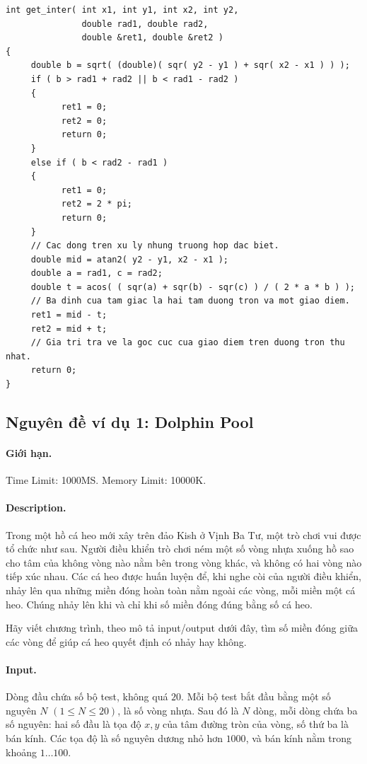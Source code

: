 \documentclass[11pt]{article}
\begin{document}
\begin{verbatim}
int get_inter( int x1, int y1, int x2, int y2,
               double rad1, double rad2,
               double &ret1, double &ret2 )
{
     double b = sqrt( (double)( sqr( y2 - y1 ) + sqr( x2 - x1 ) ) );
     if ( b > rad1 + rad2 || b < rad1 - rad2 )
     {
           ret1 = 0;
           ret2 = 0;
           return 0;
     }
     else if ( b < rad2 - rad1 )
     {
           ret1 = 0;
           ret2 = 2 * pi;
           return 0;
     }
     // Cac dong tren xu ly nhung truong hop dac biet.
     double mid = atan2( y2 - y1, x2 - x1 );
     double a = rad1, c = rad2;
     double t = acos( ( sqr(a) + sqr(b) - sqr(c) ) / ( 2 * a * b ) );
     // Ba dinh cua tam giac la hai tam duong tron va mot giao diem.
     ret1 = mid - t;
     ret2 = mid + t;
     // Gia tri tra ve la goc cuc cua giao diem tren duong tron thu nhat.
     return 0;
}
\end{verbatim}

\subsection{Nguyên đề ví dụ 1: Dolphin Pool}

\paragraph{Giới hạn.}
Time Limit: 1000MS. Memory Limit: 10000K.

\paragraph{Description.}
Trong một hồ cá heo mới xây trên đảo Kish ở Vịnh Ba Tư, một trò chơi vui được
tổ chức như sau. Người điều khiển trò chơi ném một số vòng nhựa xuống hồ sao
cho tâm của không vòng nào nằm bên trong vòng khác, và không có hai vòng nào
tiếp xúc nhau. Các cá heo được huấn luyện để, khi nghe còi của người điều
khiển, nhảy lên qua những miền đóng hoàn toàn nằm ngoài các vòng, mỗi miền một
cá heo. Chúng nhảy lên khi và chỉ khi số miền đóng đúng bằng số cá heo.

Hãy viết chương trình, theo mô tả input/output dưới đây, tìm số miền đóng giữa
các vòng để giúp cá heo quyết định có nhảy hay không.

\paragraph{Input.}
Dòng đầu chứa số bộ test, không quá \(20\). Mỗi bộ test bắt đầu bằng một số
nguyên \(N\) \((1\le N\le 20)\), là số vòng nhựa. Sau đó là \(N\) dòng, mỗi
dòng chứa ba số nguyên: hai số đầu là tọa độ \(x,y\) của tâm đường tròn của
vòng, số thứ ba là bán kính. Các tọa độ là số nguyên dương nhỏ hơn \(1000\),
và bán kính nằm trong khoảng \(1\ldots 100\).
\end{document}
